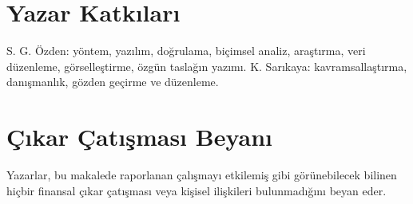 \documentclass[journal]{IEEEtran}
\begin{document}
\section*{Yazar Katkıları}
S. G. Özden: yöntem, yazılım, doğrulama, biçimsel analiz, araştırma, veri düzenleme, görselleştirme, özgün taslağın yazımı. K. Sarıkaya: kavramsallaştırma, danışmanlık, gözden geçirme ve düzenleme.

\section*{Çıkar Çatışması Beyanı}
Yazarlar, bu makalede raporlanan çalışmayı etkilemiş gibi görünebilecek bilinen hiçbir finansal çıkar çatışması veya kişisel ilişkileri bulunmadığını beyan eder.



\end{document}
